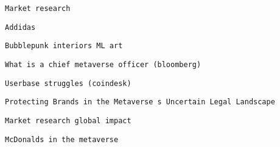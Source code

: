        
     

     
     
      \protect\hypertarget{ID_385608709}{}{}

\begin{verbatim}
Market research
\end{verbatim}

       
       
        \protect\hypertarget{ID_347023436}{}{}

\begin{verbatim}
Addidas
\end{verbatim}
       

       
       
        \protect\hypertarget{ID_1921372100}{}{}

\begin{verbatim}
Bubblepunk interiors ML art
\end{verbatim}
       

       
       
        \protect\hypertarget{ID_1453254589}{}{}

\begin{verbatim}
What is a chief metaverse officer (bloomberg)
\end{verbatim}
       

       
       
        \protect\hypertarget{ID_1217125442}{}{}

\begin{verbatim}
Userbase struggles (coindesk)
\end{verbatim}
       

       
       
        \protect\hypertarget{ID_1648930356}{}{}

\begin{verbatim}
Protecting Brands in the Metaverse s Uncertain Legal Landscape
\end{verbatim}
       

       
       
        \protect\hypertarget{ID_156822779}{}{}

\begin{verbatim}
Market research global impact
\end{verbatim}
       

       
       
        \protect\hypertarget{ID_608579008}{}{}

\begin{verbatim}
McDonalds in the metaverse
\end{verbatim}
       

